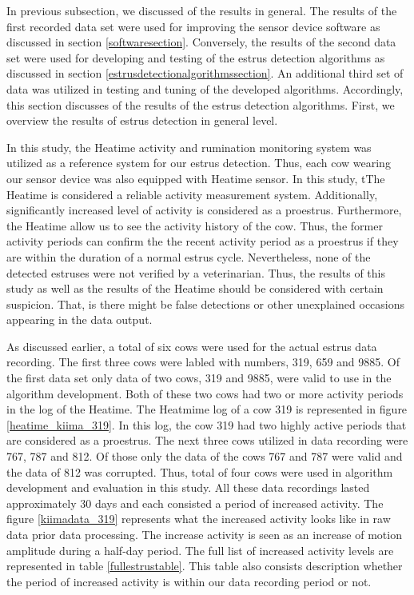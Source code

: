 \documentclass[english,12pt,a4paper,pdftex,elec,utf8]{aaltothesis}
\begin{document}
In previous subsection, we discussed of the results in general. The results of the first recorded data set were used for improving the sensor device software as discussed in section \ref{softwaresection}. Conversely, the results of the second data set were used for developing and testing of the estrus detection algorithms as discussed in section \ref{estrusdetectionalgorithmssection}. An additional third set of data was utilized in testing and tuning of the developed algorithms. Accordingly, this section discusses of the results of the estrus detection algorithms. First, we overview the results of estrus detection in general level. 

In this study, the Heatime activity and rumination monitoring system was utilized as a reference system for our estrus detection. Thus, each cow wearing our sensor device was also equipped with Heatime sensor. In this study, tThe Heatime is considered a reliable activity measurement system. Additionally, significantly increased level of activity is considered as a proestrus. Furthermore, the Heatime allow us to see the activity history of the cow. Thus, the former activity periods can confirm the the recent activity period as a proestrus if they are within the duration of a normal estrus cycle. Nevertheless, none of the detected estruses were not verified by a veterinarian. Thus, the results of this study as well as the results of the Heatime should be considered with certain suspicion. That, is there might be false detections or other unexplained occasions appearing in the data output.

As discussed earlier, a total of six cows were used for the actual estrus data recording. The first three cows were labled with numbers, 319, 659 and 9885. Of the first data set only data of two cows, 319 and 9885, were valid to use in the algorithm development. Both of these two cows had two or more activity periods in the log of the Heatime. The Heatmime log of a cow 319 is represented in figure \ref{heatime_kiima_319}. In this log, the cow 319 had two highly active periods that are considered as a proestrus. The next three cows utilized in data recording were 767, 787 and 812. Of those only the data of the cows 767 and 787 were valid and the data of 812 was corrupted. Thus, total of four cows were used in algorithm development and evaluation in this study. All these data recordings lasted approximately 30 days and each consisted a period of increased activity. The figure \ref{kiimadata_319} represents what the increased activity looks like in raw data prior data processing. The increase activity is seen as an increase of motion amplitude during a half-day period. The full list of increased activity levels are represented in table \ref{fullestrustable}. This table also consists description whether the period of increased activity is within our data recording period or not.
\end{document}
